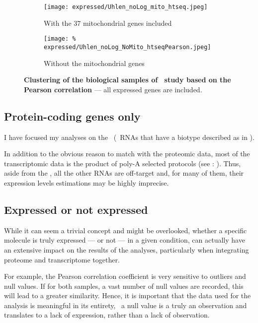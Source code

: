 \begin{figure}[!htbp]
    \centering
    \begin{subfigure}[hp]{0.85\textwidth}
        \centering
        \texttt{[image: expressed/Uhlen\_noLog\_mito\_htseq.jpeg]}
        \caption{With the 37 mitochondrial genes included}\label{fig:withMito}
    \end{subfigure}

    \begin{subfigure}[hp]{0.85\textwidth}
        \centering
        \texttt{[image: \%
            expressed/Uhlen\_noLog\_NoMito\_htseqPearson.jpeg]}
        \caption{Without the mitochondrial genes}\label{fig:NoMito}
    \end{subfigure}
    \caption[Clustering of the biological samples of \uhlen\
    dataset based on the Pearson correlation]{\label{fig:MitoNomito}\textbf{Clustering
    of the biological samples of \uhlen\ study based on the Pearson correlation}
    --- all expressed genes are included.}
\end{figure}

\subsection{Protein-coding genes only}\label{subsec:protcodingOnly}
I have focused my analyses on the \mRNAs\ (\ie\ \glspl{RNA} that have a
biotype described as \emph{\pc} in \ens{76}).

In addition to the obvious reason to match with the proteomic data,
most of the transcriptomic data is the product of poly-A selected protocols
(see \Cref{msec:polyA}: \nameref{msec:polyA}).
Thus, aside from the \mRNAs, all the other \glspl{RNA} are off-target
and, for many of them,
their expression levels estimations may be highly imprecise.


\subsection{Expressed or not expressed}\label{sec:ExpressedOrNot}

While it can seem a trivial concept and might be overlooked, whether a specific
molecule is truly expressed --- or not --- in a given condition, can actually have
an extensive impact on the results of the analyses, particularly when integrating
proteome and transcriptome together.

For example, the Pearson correlation coefficient is very
sensitive to outliers and null values. If for both samples, a vast number of
null values are recorded, this will lead to a greater similarity.
Hence, it is important that the data used for the analysis is meaningful in
its entirety, \ie\ a null value is a truly an observation and translates to
a lack of expression, rather than a lack of observation.

